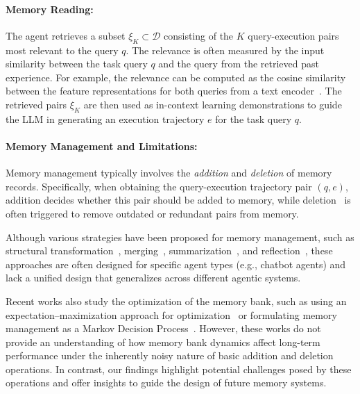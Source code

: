 \documentclass[11pt]{article}
\theoremstyle{plain}
\theoremstyle{definition}
\newcommand{\zhen}[1]{\textcolor{blue}{[Zhen: #1]}}
\begin{document}
\paragraph{Memory Reading:}  The agent retrieves a subset $\xi_K \subset \mathcal{D}$ consisting of the $K$ query-execution pairs most relevant to the query $q$. The relevance is often measured by the input similarity between the task query $q$ and the query from the retrieved past experience.
For example, the relevance can be computed as the cosine similarity between the feature representations for both queries from a text encoder~\cite{kusupati2022matryoshka}. The retrieved pairs $\xi_K$ are then used as in-context learning demonstrations to guide the LLM in generating an execution trajectory $e$ for the task query $q$.

\paragraph{Memory Management and Limitations:} 
Memory management typically involves the \textit{addition} and \textit{deletion} of memory records.
Specifically, when obtaining the query-execution trajectory pair $(q, e)$, addition decides whether this pair should be added to memory, while deletion~\cite{zhong2024memorybank,wang2024trove} is often triggered to remove outdated or redundant pairs from memory.

Although various strategies have been proposed for memory management, such as structural transformation~\cite{anokhin2024arigraph,zeng2024structural,xu2025mem}, merging~\cite{zhong2024memorybank,liu2023think,hu2024hiagent}, summarization~\cite{wang2024agent,zhong2024memorybank,pan2025memory}, and reflection~\cite{shinn2024reflexion,zhao2024expel,liang2024self}, 
these approaches are often designed for specific agent types (e.g., chatbot agents) and lack a unified design that generalizes across different agentic systems.

{Recent works also study the optimization of the memory bank, such as using an expectation–maximization approach for optimization~\cite{yin2024explicit} or formulating memory management as a Markov Decision Process~\citep{zhou2025agentfly}.
However, these works do not provide an understanding of how memory bank dynamics affect long-term performance under the inherently noisy nature of basic addition and deletion operations. In contrast, our findings highlight potential challenges posed by these operations and offer insights to guide the design of future memory systems.}
\end{document}
